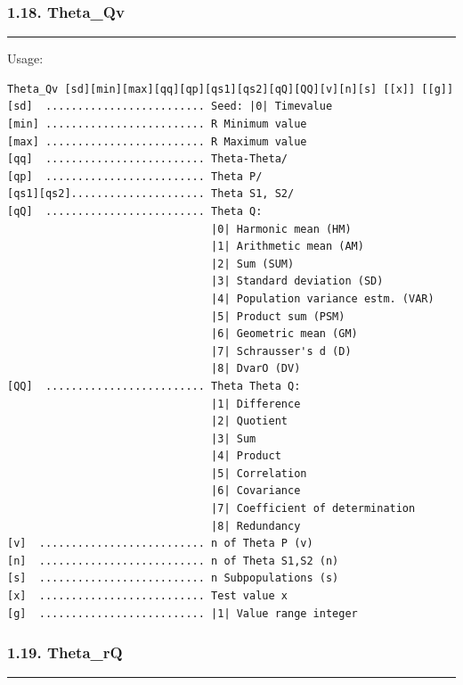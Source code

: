 \documentclass[
]{article}
\begin{document}
\hypertarget{theta_qv}{%
\subsubsection{1.18. Theta\_Qv}\label{theta_qv}}

\begin{center}\rule{0.5\linewidth}{0.5pt}\end{center}

Usage:

\begin{verbatim}
Theta_Qv [sd][min][max][qq][qp][qs1][qs2][qQ][QQ][v][n][s] [[x]] [[g]]
[sd]  ......................... Seed: |0| Timevalue
[min] ......................... R Minimum value
[max] ......................... R Maximum value
[qq]  ......................... Theta-Theta/
[qp]  ......................... Theta P/
[qs1][qs2]..................... Theta S1, S2/
[qQ]  ......................... Theta Q:
                                |0| Harmonic mean (HM)
                                |1| Arithmetic mean (AM)
                                |2| Sum (SUM)
                                |3| Standard deviation (SD)
                                |4| Population variance estm. (VAR)
                                |5| Product sum (PSM)
                                |6| Geometric mean (GM)
                                |7| Schrausser's d (D)
                                |8| DvarO (DV)
[QQ]  ......................... Theta Theta Q:
                                |1| Difference
                                |2| Quotient
                                |3| Sum
                                |4| Product
                                |5| Correlation
                                |6| Covariance
                                |7| Coefficient of determination
                                |8| Redundancy
[v]  .......................... n of Theta P (v)
[n]  .......................... n of Theta S1,S2 (n)
[s]  .......................... n Subpopulations (s)
[x]  .......................... Test value x
[g]  .......................... |1| Value range integer
\end{verbatim}

\hypertarget{theta_rq}{%
\subsubsection{1.19. Theta\_rQ}\label{theta_rq}}

\begin{center}\rule{0.5\linewidth}{0.5pt}\end{center}
\end{document}
